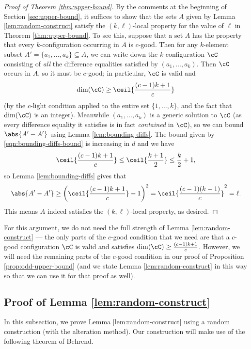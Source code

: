 \begin{proof}[Proof of Theorem \ref{thm:upper-bound}]
    By the comments at the beginning of Section \ref{sec:upper-bound}, it suffices to show that the sets $A$ given by Lemma \ref{lem:random-construct} satisfy the $(k, \ell)$-local property for the value of $\ell$ in Theorem \ref{thm:upper-bound}. To see this, suppose that a set $A$ has the property that every $k$-configuration occurring in $A$ is $c$-good. Then for any $k$-element subset $A' = \{a_1, \ldots, a_k\} \subseteq A$, we can write down the $k$-configuration $\cC$ consisting of \emph{all} the difference equalities satisfied by $(a_1, \ldots, a_k)$. Then $\cC$ occurs in $A$, so it must be $c$-good; in particular, $\cC$ is valid and \[\dim(\cC) \geq \ceil{\frac{(c - 1)k + 1}{c}}\] (by the $c$-light condition applied to the entire set $\{1, \ldots, k\}$, and the fact that $\dim(\cC)$ is an integer). Meanwhile $(a_1, \ldots, a_k)$ is a generic solution to $\cC$ (as every difference equality it satisfies is in fact \emph{contained} in $\cC$), so we can bound $\abs{A' - A'}$ using Lemma \ref{lem:bounding-diffs}. The bound given by \eqref{eqn:bounding-diffs-bound} is increasing in $d$ and we have \[\ceil{\frac{(c - 1)k + 1}{c}} \leq \ceil{\frac{k + 1}{2}} \leq \frac{k}{2} + 1,\] so Lemma \ref{lem:bounding-diffs} gives that \[\abs{A' - A'} \geq \left(\ceil{\frac{(c - 1)k + 1}{c}} - 1\right)^2 = \ceil{\frac{(c - 1)(k - 1)}{c}}^2 = \ell.\] This means $A$ indeed satisfies the $(k, \ell)$-local property, as desired. 
\end{proof}

\begin{remark}
    For this argument, we do not need the full strength of Lemma \ref{lem:random-construct} --- the only parts of the $c$-good condition that we need are that a $c$-good configuration $\cC$ is valid and satisfies $\dim(\cC) \geq \frac{(c - 1)k + 1}{c}$. However, we will need the remaining parts of the $c$-good condition in our proof of Proposition \ref{prop:odd-upper-bound} (and we state Lemma \ref{lem:random-construct} in this way so that we can use it for that proof as well).
\end{remark}

\subsection{Proof of Lemma \ref{lem:random-construct}} \label{subsec:random-construct}

In this subsection, we prove Lemma \ref{lem:random-construct} using a random construction (with the alteration method). Our construction will make use of the following theorem of Behrend. 

